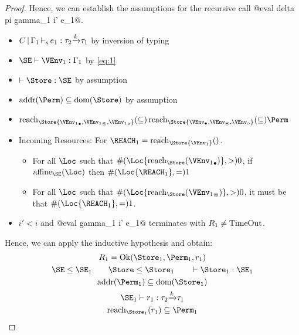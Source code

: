 \begin{proof}
  Hence, we can establish the assumptions for the recursive call 
  @eval delta pi gamma_1 i' e_1@.
  \begin{itemize}
  \item  $C \operatorname{|} \Gamma_1 \operatorname{\vdash_s} e_1 : \tau_2{\xrightarrow{k}}\tau_1$ by inversion of typing
  \item $\SE \vdash \VEnv_1 : \E_1$ by \eqref{eq:1}
  \item $\vdash \Store : \SE$ by assumption
  \item $\Addresses\Perm \subseteq \Dom\Store$ by assumption 
  \item $
    \Reach\Store{\Active{\VEnv_1}, \MutableBorrows{\VEnv_1},
      \ImmutableBorrows{\VEnv_1}}
    \subseteq
    \Reach\Store{\Active\VEnv, \MutableBorrows\VEnv, \ImmutableBorrows\VEnv}
    \subseteq \Perm$
  \item Incoming Resources: For $\REACH_1 = \Reach\Store{\VEnv_1}$.
    \begin{itemize}
    \item 
      For all $\Loc$ such that $\MultiNumber\Loc{\Reach{\Store}{\Active{\VEnv_1}}} >0$,
      if $\Affine{\SE}\Loc$ then $\MultiNumber\Loc{\REACH_1}= 1$
    \item For all $\Loc$ such that $
      \MultiNumber\Loc{\Reach{\Store}{\MutableBorrows{\VEnv_1}}} >0$, it
      must be that $\MultiNumber\Loc{\REACH_1}=1$.
    \end{itemize}
  \item $i'<i$ and   @eval \Store \Perm gamma_1 i' e_1@ terminates
    with $R_1 \ne \operatorname{TimeOut}$.
  \end{itemize}
  Hence, we can apply the inductive hypothesis and obtain:
  \begin{gather}
    \label{eq:2}
    R_1 = \Ok{\Store_1, \Perm_1, r_1}
    \\
    \SE \le \SE_1 \qquad
    \Store \le \Store_1 \qquad
    \vdash \Store_1 :    \SE_1
    \\
    \Addresses{\Perm_1} \subseteq \Dom{\Store_1}
    \\\label{eq:3}
    \SE_1 \vdash r_1 : \tau_2\tarr{k}\tau_1
    \\\label{eq:10}
    \Reach{\Store_1}{r_1} \subseteq \Perm_1
  \end{gather}
\end{proof}
